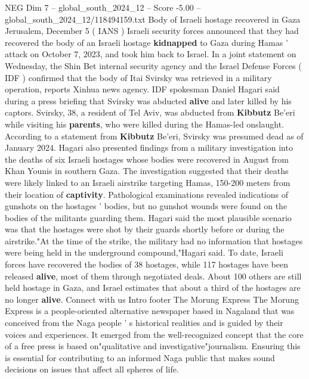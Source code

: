 \begin{textsample}{NEG Dim 7 – global\_south\_2024\_12 – Score -5.00 – global\_south\_2024\_12/118494159.txt}  \label{ex:f7_neg_297}
Body of Israeli hostage recovered in Gaza Jerusalem, December 5 ( IANS ) Israeli security forces announced that they had recovered the body of an Israeli hostage \textbf{kidnapped} to Gaza during Hamas ' attack on October 7, 2023, and took him back to Israel.
In a joint statement on Wednesday, the Shin Bet internal security agency and the Israel Defense Forces ( IDF ) confirmed that the body of Itai Svirsky was retrieved in a military operation, reports Xinhua news agency.
IDF spokesman Daniel Hagari said during a press briefing that Svirsky was abducted \textbf{alive} and later killed by his captors.
Svirsky, 38, a resident of Tel Aviv, was abducted from \textbf{Kibbutz} Be'eri while visiting his \textbf{parents}, who were killed during the Hamas-led onslaught.
According to a statement from \textbf{Kibbutz} Be'eri, Svirsky was presumed dead as of January 2024.
Hagari also presented findings from a military investigation into the deaths of six Israeli hostages whose bodies were recovered in August from Khan Younis in southern Gaza.
The investigation suggested that their deaths were likely linked to an Israeli airstrike targeting Hamas, 150-200 meters from their location of \textbf{captivity}.
Pathological examinations revealed indications of gunshots on the hostages ' bodies, but no gunshot wounds were found on the bodies of the militants guarding them.
Hagari said the most plausible scenario was that the hostages were shot by their guards shortly before or during the airstrike."At the time of the strike, the military had no information that hostages were being held in the underground compound,"Hagari said.
To date, Israeli forces have recovered the bodies of 38 hostages, while 117 hostages have been released \textbf{alive}, most of them through negotiated deals.
About 100 others are still held hostage in Gaza, and Israel estimates that about a third of the hostages are no longer \textbf{alive}.
Connect with us Intro footer The Morung Express The Morung Express is a people-oriented alternative newspaper based in Nagaland that was conceived from the Naga people ' s historical realities and is guided by their voices and experiences.
It emerged from the well-recognized concept that the core of a free press is based on"qualitative and investigative"journalism.
Ensuring this is essential for contributing to an informed Naga public that makes sound decisions on issues that affect all spheres of life.

\end{textsample}
